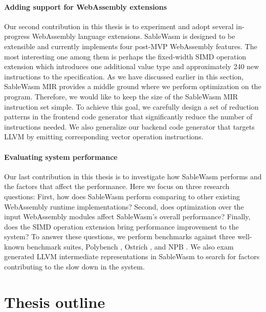 \paragraph{Adding support for WebAssembly extensions}
Our second contribution in this thesis is to experiment and adopt several
in-progress WebAssembly language extensions. SableWasm is designed to be
extensible and currently implements four post-MVP WebAssembly features. The
most interesting one among them is perhaps the fixed-width SIMD operation
extension which introduces one additional value type and approximately 240
new instructions to the specification. As we have discussed earlier in this
section, SableWasm MIR provides a middle ground where we perform optimization
on the program. Therefore, we would like to keep the size of the SableWasm MIR
instruction set simple. To achieve this goal, we carefully design a set of
reduction patterns in the frontend code generator that significantly reduce the
number of instructions needed. We also generalize our backend code generator
that targets LLVM by emitting corresponding vector operation instructions.

\paragraph{Evaluating system performance}
Our last contribution in this thesis is to investigate how SableWasm performs
and the factors that affect the performance. Here we focus on three research
questions: First, how does SableWasm perform comparing to other existing
WebAssembly runtime implementations? Second, does optimization over the input
WebAssembly modules affect SableWasm's overall performance? Finally, does the
SIMD operation extension bring performance improvement to the system? To answer
these questions, we perform benchmarks against three well-known benchmark
suites, Polybench \cite{polybench}, Ostrich \cite{ostrich}, and NPB \cite{npb}.
We also exam generated LLVM intermediate representations in SableWasm to search
for factors contributing to the slow down in the system.

\section{Thesis outline}

